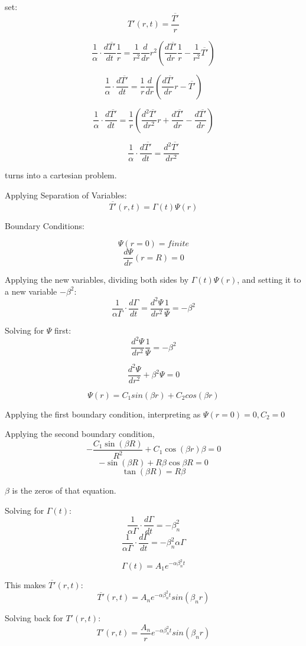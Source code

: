 \documentclass[12pt,letterpaper]{article}
\begin{document}
{{set:
\[T'(r,t) = \frac{\overline{T'}}{r} \]


\[\frac{1}{\alpha} \cdot \frac{d\overline{T'}}{dt} \frac{1}{r} = \frac{1}{r^2} \frac{d}{dr} r^2 (\frac{d\overline{T'}}{dr} \frac{1}{r} - \frac{1}{r^2} \overline{T'}) \]

\[\frac{1}{\alpha} \cdot \frac{d\overline{T'}}{dt} = \frac{1}{r} \frac{d}{dr} (\frac{d\overline{T'}}{dr} r - \overline{T'}) \]

\[\frac{1}{\alpha} \cdot \frac{d\overline{T'}}{dt} = \frac{1}{r} (\frac{d^2\overline{T'}}{dr^2} r + \frac{d\overline{T'}}{dr} - \frac{d\overline{T'}}{dr}) \]

\[\frac{1}{\alpha} \cdot \frac{d\overline{T'}}{dt} = \frac{d^2\overline{T'}}{dr^2} \]

turns into a cartesian problem.

Applying Separation of Variables:
\[\overline{T'}(r,t) = \Gamma (t) \Psi (r)  \]

Boundary Conditions:

\[\Psi(r = 0) = finite \]
\[\frac{d\Psi}{dr} (r = R) = 0 \]

Applying the new variables, dividing both sides by $\Gamma (t) \Psi (r) $,
and setting it to a new variable $ -\beta^2 $:
\[\frac{1}{\alpha  \Gamma} \cdot \frac{d\Gamma}{dt} = \frac{d^2 \Psi}{dr^2} \frac{1}{\Psi} = -\beta^2 \] 

Solving for $\Psi$ first:
\[\frac{d^2 \Psi}{dr^2} \frac{1}{\Psi} = -\beta^2 \]

\[\frac{d^2 \Psi}{dr^2} + \beta^2 \Psi = 0 \]

\[\Psi (r) = C_1 sin(\beta r) + C_2 cos(\beta r) \]

Applying the first boundary condition,
interpreting as $\Psi(r=0) = 0 , C_2 = 0$

Applying the second boundary condition,
\[-\frac{C_1 \sin(\beta R)}{R^2} + C_1 \cos(\beta r) \beta = 0 \]
\[-\sin(\beta R) + R \beta \cos{\beta R} =0 \]
\[\tan(\beta R ) = R\beta \]

$\beta$ is the zeros of that equation.

Solving for $\Gamma(t)$:
\[\frac{1}{\alpha  \Gamma} \cdot \frac{d\Gamma}{dt} = -\beta_n^2 \]
\[\frac{1}{\alpha  \Gamma} \cdot \frac{d\Gamma}{dt} = -\beta_n^2 \alpha \Gamma \]

\[\Gamma(t) = A_1 e^{-\alpha \beta_n^2 t }\]

This makes $\overline{T'}(r,t)$:
\[\overline{T'}(r,t) = A_n e^{-\alpha \beta_n^2 t} sin(\beta_n r)\]

Solving back for $T'(r,t)$:
\[T'(r,t) = \frac{A_n}{r} e^{-\alpha \beta_n^2 t} sin(\beta_n r)\]

}}
\end{document}
